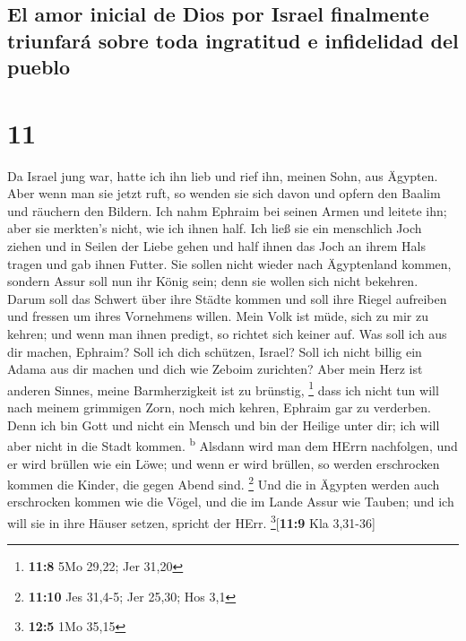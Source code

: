 \hypertarget{el-amor-inicial-de-dios-por-israel-finalmente-triunfaruxe1-sobre-toda-ingratitud-e-infidelidad-del-pueblo}{%
\subsection{El amor inicial de Dios por Israel finalmente triunfará
sobre toda ingratitud e infidelidad del
pueblo}\label{el-amor-inicial-de-dios-por-israel-finalmente-triunfaruxe1-sobre-toda-ingratitud-e-infidelidad-del-pueblo}}

\hypertarget{section-10}{%
\section{11}\label{section-10}}

 Da Israel jung war, hatte ich ihn lieb und rief ihn,
meinen Sohn, aus Ägypten.  Aber wenn man sie jetzt ruft,
so wenden sie sich davon und opfern den Baalim und räuchern den Bildern.
 Ich nahm Ephraim bei seinen Armen und leitete ihn; aber
sie merkten's nicht, wie ich ihnen half.  Ich ließ sie ein
menschlich Joch ziehen und in Seilen der Liebe gehen und half ihnen das
Joch an ihrem Hals tragen und gab ihnen Futter.  Sie
sollen nicht wieder nach Ägyptenland kommen, sondern Assur soll nun ihr
König sein; denn sie wollen sich nicht bekehren.  Darum
soll das Schwert über ihre Städte kommen und soll ihre Riegel aufreiben
und fressen um ihres Vornehmens willen.  Mein Volk ist
müde, sich zu mir zu kehren; und wenn man ihnen predigt, so richtet sich
keiner auf.  Was soll ich aus dir machen, Ephraim? Soll
ich dich schützen, Israel? Soll ich nicht billig ein Adama aus dir
machen und dich wie Zeboim zurichten? Aber mein Herz ist anderen Sinnes,
meine Barmherzigkeit ist zu brünstig, \footnote{\textbf{11:8} 5Mo 29,22;
  Jer 31,20}  dass ich nicht tun will nach meinem
grimmigen Zorn, noch mich kehren, Ephraim gar zu verderben. Denn ich bin
Gott und nicht ein Mensch und bin der Heilige unter dir; ich will aber
nicht in die Stadt kommen. \textsuperscript{b}  Alsdann
wird man dem HErrn nachfolgen, und er wird brüllen wie ein Löwe; und
wenn er wird brüllen, so werden erschrocken kommen die Kinder, die gegen
Abend sind. \footnote{\textbf{11:10} Jes 31,4-5; Jer 25,30; Hos 3,1}
 Und die in Ägypten werden auch erschrocken kommen wie
die Vögel, und die im Lande Assur wie Tauben; und ich will sie in ihre
Häuser setzen, spricht der HErr. \footnote{\textbf{12:5} 1Mo 35,15}{[}\textbf{11:9}
Kla 3,31-36{]}

